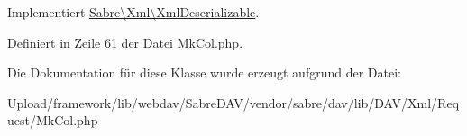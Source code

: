 Implementiert \mbox{\hyperlink{interface_sabre_1_1_xml_1_1_xml_deserializable_a19e0eca545b9a0d93f7d6b69085ade30}{Sabre\textbackslash{}\+Xml\textbackslash{}\+Xml\+Deserializable}}.



Definiert in Zeile 61 der Datei Mk\+Col.\+php.



Die Dokumentation für diese Klasse wurde erzeugt aufgrund der Datei\+:\begin{DoxyCompactItemize}
\item 
Upload/framework/lib/webdav/\+Sabre\+D\+A\+V/vendor/sabre/dav/lib/\+D\+A\+V/\+Xml/\+Request/Mk\+Col.\+php\end{DoxyCompactItemize}
